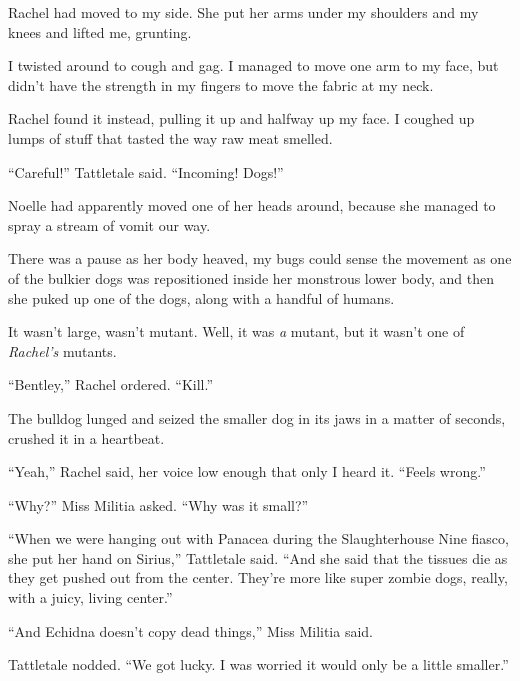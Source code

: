 Rachel had moved to my side.  She put her arms under my shoulders and my knees and lifted me, grunting.



I twisted around to cough and gag.  I managed to move one arm to my face, but didn't have the strength in my fingers to move the fabric at my neck.



Rachel found it instead, pulling it up and halfway up my face.  I coughed up lumps of stuff that tasted the way raw meat smelled.



``Careful!'' Tattletale said.  ``Incoming!  Dogs!''



Noelle had apparently moved one of her heads around, because she managed to spray a stream of vomit our way.



There was a pause as her body heaved, my bugs could sense the movement as one of the bulkier dogs was repositioned inside her monstrous lower body, and then she puked up one of the dogs, along with a handful of humans.



It wasn't large, wasn't mutant.  Well, it was \emph{a} mutant, but it wasn't one of \emph{Rachel's} mutants.



``Bentley,'' Rachel ordered.  ``Kill.''



The bulldog lunged and seized the smaller dog in its jaws in a matter of seconds, crushed it in a heartbeat.



``Yeah,'' Rachel said, her voice low enough that only I heard it.  ``Feels wrong.''



``Why?'' Miss Militia asked.  ``Why was it small?''



``When we were hanging out with Panacea during the Slaughterhouse Nine fiasco, she put her hand on Sirius,'' Tattletale said.  ``And she said that the tissues die as they get pushed out from the center.  They're more like super zombie dogs, really, with a juicy, living center.''



``And Echidna doesn't copy dead things,'' Miss Militia said.



Tattletale nodded.  ``We got lucky.  I was worried it would only be a little smaller.''



